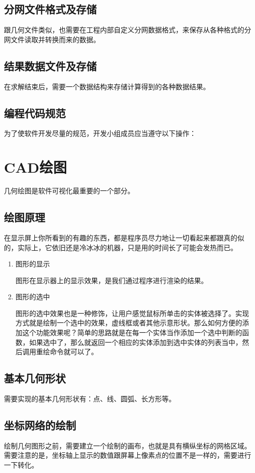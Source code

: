 \subsection{分网文件格式及存储}
跟几何文件类似，也需要在工程内部自定义分网数据格式，来保存从各种格式的分网文件读取并转换而来的数据。
\subsection{结果数据文件及存储}
在求解结束后，需要一个数据结构来存储计算得到的各种数据结果。
\subsection{编程代码规范}
为了使软件开发尽量的规范，开发小组成员应当遵守以下操作：
\section{CAD绘图}
几何绘图是软件可视化最重要的一个部分。
\subsection{绘图原理}
在显示屏上你所看到的有趣的东西，都是程序员尽力地让一切看起来都跟真的似的，实际上，它依旧还是冷冰冰的机器，只是用的时间长了可能会发热而已。

\begin{enumerate}
	\item 图形的显示
	
\hspace*{2em} 图形在显示器上的显示效果，是我们通过程序进行渲染的结果。
	\item 图形的选中
	
\hspace*{2em} 图形的选中效果也是一种修饰，让用户感觉鼠标所单击的实体被选择了。实现方式就是绘制一个选中的效果，虚线框或者其他示意形状。那么如何方便的添加这个功能效果呢？简单的思路就是在每一个实体当作添加一个选中判断的函数，如果选中了，那么就返回一个相应的实体添加到选中实体的列表当中，然后调用重绘命令就可以了。
\end{enumerate}
\subsection{基本几何形状}
需要实现的基本几何形状有：点、线、圆弧、长方形等。
\subsection{坐标网络的绘制}
绘制几何图形之前，需要建立一个绘制的画布，也就是具有横纵坐标的网格区域。需要注意的是，坐标轴上显示的数值跟屏幕上像素点的位置不是一样的，需要进行一下转化。

